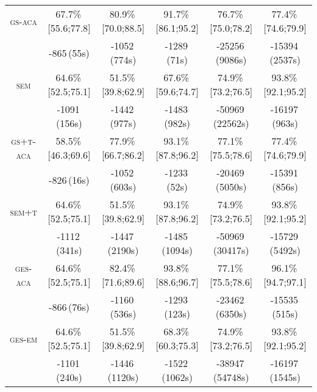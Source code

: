 \begin{table}[!t]
\begin{tabular}{@{}c@{\,}|@{\,}ccccc@{}}
\textsc{gs-aca}& 67.7\%\,{\scriptsize[55.6;77.8]} & 80.9\%\,{\scriptsize[70.0;88.5]} & 91.7\%\,{\scriptsize[86.1;95.2]} & 76.7\%\,{\scriptsize[75.0;78.2]} & 77.4\%\,{\scriptsize[74.6;79.9]} \\
&  -865\,\scriptsize(55s) & -1052\,\scriptsize(774s) & -1289\,\scriptsize(71s) & -25256\,\scriptsize(9086s) & -15394\,\scriptsize(2537s) \\

\textsc{sem}& 64.6\%\,{\scriptsize[52.5;75.1]} & 51.5\%\,{\scriptsize[39.8;62.9]} & 67.6\%\,{\scriptsize[59.6;74.7]} & 74.9\%\,{\scriptsize[73.2;76.5]} & 93.8\%\,{\scriptsize[92.1;95.2]} \\
& -1091\,\scriptsize(156s) & -1442\,\scriptsize(977s) & -1483\,\scriptsize(982s) & -50969\,\scriptsize(22562s) & -16197\,\scriptsize(963s) \\\hline

\textsc{gs+t-aca}& 58.5\%\,{\scriptsize[46.3;69.6]} & 77.9\%\,{\scriptsize[66.7;86.2]} & 93.1\%\,{\scriptsize[87.8;96.2]} & 77.1\%\,{\scriptsize[75.5;78.6]} & 77.4\%\,{\scriptsize[74.6;79.9]} \\
&  -826\,\scriptsize(16s) & -1052\,\scriptsize(603s) & -1233\,\scriptsize(52s) & -20469\,\scriptsize(5050s) & -15391\,\scriptsize(856s) \\

\textsc{sem+t}& 64.6\%\,{\scriptsize[52.5;75.1]} & 51.5\%\,{\scriptsize[39.8;62.9]} & 93.1\%\,{\scriptsize[87.8;96.2]} & 74.9\%\,{\scriptsize[73.2;76.5]} & 93.8\%\,{\scriptsize[92.1;95.2]} \\
& -1112\,\scriptsize(341s) & -1447\,\scriptsize(2190s) & -1485\,\scriptsize(1094s) & -50969\,\scriptsize(30417s) & -15729\,\scriptsize(5492s) \\\hline

\textsc{ges-aca}& 64.6\%\,{\scriptsize[52.5;75.1]} & 82.4\%\,{\scriptsize[71.6;89.6]} & 93.8\%\,{\scriptsize[88.6;96.7]} & 77.1\%\,{\scriptsize[75.5;78.6]} & 96.1\%\,{\scriptsize[94.7;97.1]} \\
&  -866\,\scriptsize(76s) & -1160\,\scriptsize(536s) & -1293\,\scriptsize(123s) & -23462\,\scriptsize(6350s) & -15535\,\scriptsize(515s) \\

\textsc{ges-em}& 64.6\%\,{\scriptsize[52.5;75.1]} & 51.5\%\,{\scriptsize[39.8;62.9]} & 68.3\%\,{\scriptsize[60.3;75.3]} & 74.9\%\,{\scriptsize[73.2;76.5]} & 93.8\%\,{\scriptsize[92.1;95.2]} \\
& -1101\,\scriptsize(240s) & -1446\,\scriptsize(1120s) & -1522\,\scriptsize(1062s) & -38947\,\scriptsize(54748s) & -16197\,\scriptsize(1545s) \\\hline



\end{tabular}
\end{table}

